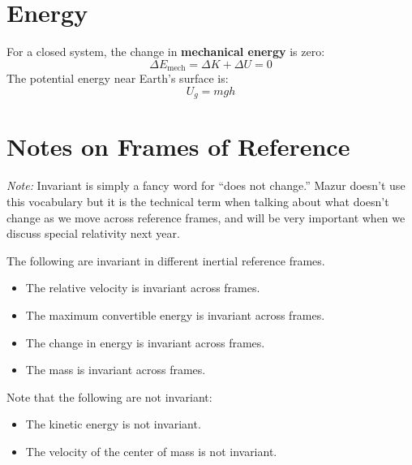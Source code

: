 \documentclass{article}
\let\oldtextbf\textbf
\renewcommand{\textbf}[1]{\oldtextbf{#1}\index{#1}}
\begin{document}
\section{Energy}
For a closed system, the change in \textbf{mechanical energy} is zero:
\begin{equation}
    \Delta E_\text{mech}=\Delta K + \Delta U = 0
    \label{eq:}
\end{equation}
The potential energy near Earth's surface is:
\begin{equation}
    U_g = mgh
    \label{eq:}
\end{equation}
\section{Notes on Frames of Reference}
\textit{Note:} Invariant is simply a fancy word for ``does not change.'' Mazur doesn't use this vocabulary but it is the technical term when talking about what doesn't change as we move across reference frames, and will be very important when we discuss special relativity next year.

The following are invariant in different inertial reference frames.
\begin{itemize}
    \item The relative velocity is invariant across frames.
    \item The maximum convertible energy is invariant across frames.
    \item The change in energy is invariant across frames.
    \item The mass is invariant across frames.
\end{itemize}

Note that the following are not invariant:
\begin{itemize}
    \item The kinetic energy is not invariant.
    \item The velocity of the center of mass is not invariant.
\end{itemize}
\end{document}
